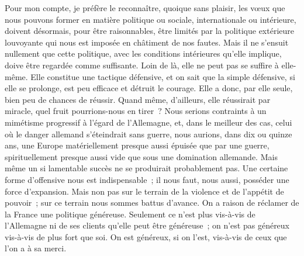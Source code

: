 \documentclass[french,twoside]{book} %
\begin{document}
Pour mon compte, je préfère le reconnaître, quoique sans plaisir, les vœux que nous pouvons former en matière politique ou sociale, internationale ou intérieure, doivent désormais, pour être raisonnables, être limités par la politique extérieure louvoyante qui nous est imposée en châtiment de nos fautes. Mais il ne s'ensuit nullement que cette politique, avec les conditions intérieures qu'elle implique, doive être regardée comme suffisante. Loin de là, elle ne peut pas se suffire à elle-même. Elle constitue une tactique défensive, et on sait que la simple défensive, si elle se prolonge, est peu efficace et détruit le courage. Elle a donc, par elle seule, bien peu de chances de réussir. Quand même, d'ailleurs, elle réussirait par miracle, quel fruit pourrions-nous en tirer ? Nous serions contraints à un mimétisme progressif à l'égard de l'Allemagne, et, dans le meilleur des cas, celui où le danger allemand s'étein­drait sans guerre, nous aurions, dans dix ou quinze ans, une Europe matérielle­ment presque aussi épuisée que par une guerre, spirituellement presque aussi vide que sous une domination allemande. Mais même un si lamentable succès ne se produirait probablement pas. Une certaine forme d'offensive nous est indispensable ; il nous faut, nous aussi, posséder une force d'expansion. Mais non pas sur le terrain de la violence et de l'appétit de pouvoir ; sur ce terrain nous sommes battus d'avance. On a raison de réclamer de la France une politique généreuse. Seulement ce n'est plus vis-à-vis de l'Allemagne ni de ses clients qu'elle peut être généreuse ; on n'est pas généreux vis-à-vis de plus fort que soi. On est généreux, si on l'est, vis-à-vis de ceux que l'on a à sa merci.\par
\end{document}
